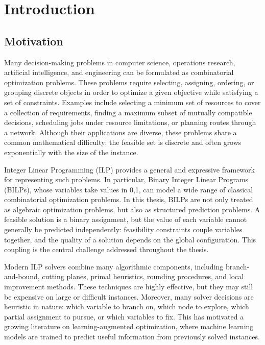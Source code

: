 \chapter{Introduction}\label{chap0:intro}

\section{Motivation}

Many decision-making problems in computer science, operations research, artificial intelligence, and engineering can be formulated as combinatorial  optimization problems. These problems require selecting, assigning, ordering, or grouping discrete objects in order to optimize a given objective while satisfying a set of constraints. Examples include selecting a minimum set of resources to cover a collection of requirements, finding a maximum subset of mutually compatible decisions, scheduling jobs under resource limitations, or planning routes through a network. Although their applications are diverse, these problems share a common mathematical difficulty: the feasible set is discrete and often grows exponentially with the size of the instance.

Integer Linear Programming (ILP) provides a general and expressive framework for representing such problems. In particular, Binary Integer Linear Programs (BILPs), whose variables take values in {0,1}, can model a wide range of classical combinatorial optimization problems. In this thesis, BILPs are not only treated as algebraic optimization problems, but also as structured prediction problems. A feasible solution is a binary assignment, but the value of each variable cannot generally be predicted independently: feasibility constraints couple variables together, and the quality of a solution depends on the global configuration. This coupling is the central challenge addressed throughout the thesis.

Modern ILP solvers combine many algorithmic components, including branch-and-bound, cutting planes, primal heuristics, rounding procedures, and local improvement methods. These techniques are highly effective, but they may still be expensive on large or difficult instances. Moreover, many solver decisions are heuristic in nature: which variable to branch on, which node to explore, which partial assignment to pursue, or which variables to fix. This has motivated a growing literature on learning-augmented optimization, where machine learning models are trained to predict useful information from previously solved instances.

